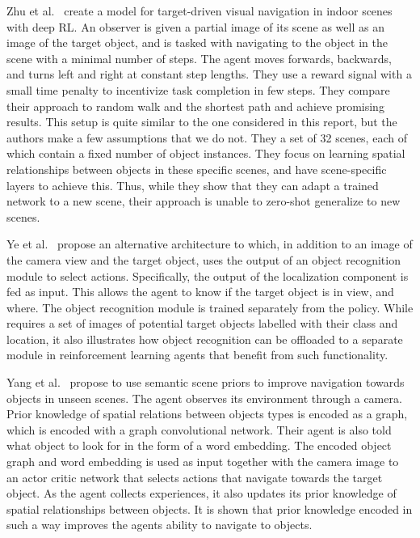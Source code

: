 Zhu et al.~\cite{zhu_target-driven_2017} create a model for target-driven visual navigation in indoor scenes with deep RL.
An observer is given a partial image of its scene as well as an image of the target object, and is tasked with navigating to the object in the scene with a minimal number of steps.
The agent moves forwards, backwards, and turns left and right at constant step lengths.
They use a reward signal with a small time penalty to incentivize task completion in few steps.
They compare their approach to random walk and the shortest path and achieve promising results.
This setup is quite similar to the one considered in this report, but the authors make a few assumptions that we do not.
They a set of 32 scenes, each of which contain a fixed number of object instances.
They focus on learning spatial relationships between objects in these specific scenes, and have scene-specific layers to achieve this.
Thus, while they show that they can adapt a trained network to a new scene, their approach is unable to zero-shot generalize to new scenes.

Ye et al.~\cite{ye_active_2018} propose an alternative architecture to \cite{zhu_target-driven_2017} which, in addition to an image of the camera view and the target object, uses the output of an object recognition module to select actions.
Specifically, the output of the localization component is fed as input.
This allows the agent to know if the target object is in view, and where.
The object recognition module is trained separately from the policy.
While requires a set of images of potential target objects labelled with their class and location, it also illustrates how object recognition can be offloaded to a separate module in reinforcement learning agents that benefit from such functionality.

Yang et al.~\cite{yang_visual_2018} propose to use semantic scene priors to improve navigation towards objects in unseen scenes.
The agent observes its environment through a camera.
Prior knowledge of spatial relations between objects types is encoded as a graph, which is encoded with a graph convolutional network.
Their agent is also told what object to look for in the form of a word embedding.
The encoded object graph and word embedding is used as input together with the camera image to an actor critic network that selects actions that navigate towards the target object.
As the agent collects experiences, it also updates its prior knowledge of spatial relationships between objects.
It is shown that prior knowledge encoded in such a way improves the agents ability to navigate to objects.

